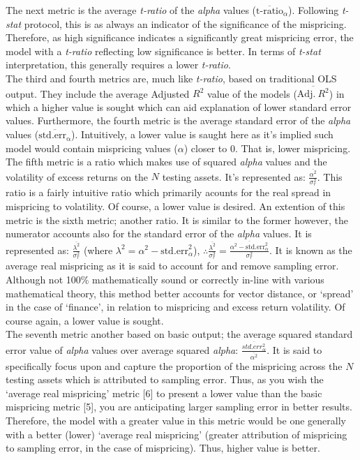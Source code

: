 \documentclass[11pt, english]{article}
\begin{document}
	The next metric is the average \textit{t-ratio} of the \textit{alpha} values ($\overline{\textrm{t-ratio}}_{\alpha}$). Following \textit{t-stat} protocol, this is as always an indicator of the significance of the mispricing. Therefore, as high significance indicates a significantly great mispricing error, the model with a \textit{t-ratio} reflecting low significance is better. In terms of \textit{t-stat} interpretation, this generally requires a lower \textit{t-ratio}.\\

	The third and fourth metrics are, much like \textit{t-ratio}, based on traditional OLS output. They include the average Adjusted $R^2$ value of the models ($\overline{\mathrm{Adj.}\ R^2}$) in which a higher value is sought which can aid explanation of lower standard error values. Furthermore, the fourth metric is the average standard error of the \textit{alpha} values ($\overline{\mathrm{std.err_{\alpha}}}$). Intuitively, a lower value is saught here as it's implied such model would contain mispricing values ($\alpha$) closer to 0. That is, lower mispricing.\\

	The fifth metric is a ratio which makes use of squared \textit{alpha} values and the volatility of excess returns on the $N$ testing assets. It's represented as: $\frac{\overline{\alpha^2}}{\sigma_r^2}$. This ratio is a fairly intuitive ratio which primarily acounts for the real spread in mispricing to volatility. Of course, a lower value is desired. An extention of this metric is the sixth metric; another ratio. It is similar to the former however, the numerator accounts also for the standard error of the \textit{alpha} values. It is represented as: $\frac{\overline{\lambda^2}}{\sigma_r^2}$ (where $\lambda^2=\alpha^2-\textrm{std.err}_{\alpha}^2$), $\therefore\frac{\overline{\lambda^2}}{\sigma_r^2}=\frac{\overline{\alpha^2-\textrm{std.err}_{\alpha}^2}}{\sigma_r^2}$. It is known as the average real mispricing as it is said to account for and remove sampling error. Although not 100\% mathematically sound or correctly in-line with various mathematical theory, this method better accounts for vector distance, or `spread' in the case of `finance', in relation to mispricing and excess return volatility. Of course again, a lower value is sought.\\

	The seventh metric another based on basic output; the average squared standard error value of \textit{alpha} values over average squared \textit{alpha}: $\frac{\overline{std.err_{\alpha}^2}}{\overline{\alpha^2}}$. It is said to specifically focus upon and capture the proportion of the mispricing across the $N$ testing assets which is attributed to sampling error. Thus, as you wish the `average real mispricing' metric [6] to present a lower value than the basic mispricing metric [5], you are anticipating larger sampling error in better results. Therefore, the model with a greater value in this metric would be one generally with a better (lower) `average real mispricing' (greater attribution of mispricing to sampling error, in the case of mispricing). Thus, higher value is better.\\
\end{document}
